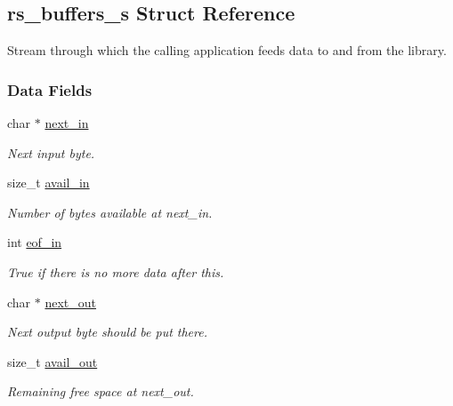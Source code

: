 \hypertarget{structrs__buffers__s}{
\subsection{rs\_\-buffers\_\-s Struct Reference}
\label{structrs__buffers__s}
}
Stream through which the calling application feeds data to and from the library.  


\subsubsection*{Data Fields}
\begin{CompactItemize}
\item 
char $\ast$ \hyperlink{structrs__buffers__s_6d5d12a1ced9a3a8891259e09c80ec20}{next\_\-in}
\begin{CompactList}\small\item\em Next input byte. \item\end{CompactList}\item 
size\_\-t \hyperlink{structrs__buffers__s_7bd5f1ea3c26587bf1106c1594712735}{avail\_\-in}
\begin{CompactList}\small\item\em Number of bytes available at next\_\-in. \item\end{CompactList}\item 
int \hyperlink{structrs__buffers__s_a6783da2d894c77178155759cd12d16f}{eof\_\-in}
\begin{CompactList}\small\item\em True if there is no more data after this. \item\end{CompactList}\item 
char $\ast$ \hyperlink{structrs__buffers__s_f3a6532c3e300a07783d61680cbdc11f}{next\_\-out}
\begin{CompactList}\small\item\em Next output byte should be put there. \item\end{CompactList}\item 
size\_\-t \hyperlink{structrs__buffers__s_e60f3db2f518d74aee13a02b7c9619a2}{avail\_\-out}
\begin{CompactList}\small\item\em Remaining free space at next\_\-out. \item\end{CompactList}\end{CompactItemize}


